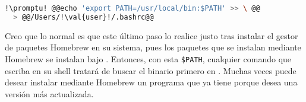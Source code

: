 \begin{lstlisting}[gobble=2,language=bash,style=bashinteract,escapechar=!]
  !\promptu! @@echo 'export PATH=/usr/local/bin:$PATH' >> \ @@
  > @@/Users/!\val{user}!/.bashrc@@
\end{lstlisting}

Creo que lo normal es que este último paso lo realice justo tras instalar el gestor de paquetes Homebrew en su
sistema, pues los paquetes que se instalan mediante Homebrew se instalan bajo . Entonces, con
esta \lstinline!$PATH!, cualquier comando que escriba en su shell tratará de buscar el binario primero en
. Muchas veces puede desear instalar mediante Homebrew un programa que ya tiene porque desea
una versión más actualizada.

